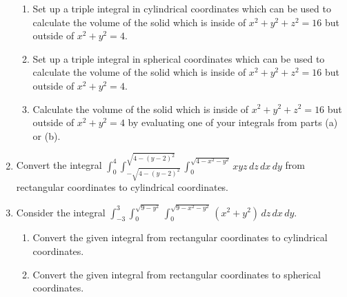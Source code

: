 \documentclass[12pt]{article}
\newif\ifans
\begin{document}
\begin{enumerate}
\begin{enumerate}

\item Set up a triple integral in cylindrical coordinates which can be used to calculate the volume of the solid which is inside of $x^2+y^2+z^2=16$ but outside of $x^2+y^2=4$.

\ifans{\fbox{$V=\int_0^{2\pi} \int_2^4 \int_{-\sqrt{16-r^2}}^{\sqrt{16-r^2}} r \,dz\,dr\,d\theta$}} \fi

\item Set up a triple integral in spherical coordinates which can be used to calculate the volume of the solid which is inside of $x^2+y^2+z^2=16$ but outside of $x^2+y^2=4$.

\ifans{\fbox{$V=\int_0^{2\pi} \int_{\pi/6}^{5\pi/6} \int_{2\csc{\phi}}^4 \rho^2\sin{\phi} \,d\rho\,d\phi\,d\theta$}} \fi

\item Calculate the volume of the solid which is inside of $x^2+y^2+z^2=16$ but outside of $x^2+y^2=4$ by evaluating one of your integrals from parts (a) or (b).

\ifans{\fbox{$32\pi\sqrt{3}$}} \fi

\end{enumerate}

\item Convert the integral $\int_0^4 \int_{-\sqrt{4-(y-2)^2}}^{\sqrt{4-(y-2)^2}} \int_0^{\sqrt{4-x^2-y^2}} xyz \,dz\,dx\,dy$ from rectangular coordinates to cylindrical coordinates.

\ifans{\fbox{$\int_0^\pi \int_0^{4\sin{\theta}} \int_0^{\sqrt{4-r^2}} r^3z\cos{\theta}\sin{\theta} \,dz\,dr\,d\theta$}} \fi

\item Consider the integral $\int_{-3}^3 \int_0^{\sqrt{9-y^2}} \int_0^{\sqrt{9-x^2-y^2}} (x^2+y^2) \,dz\,dx\,dy$.

\begin{enumerate}

\item Convert the given integral from rectangular coordinates to cylindrical coordinates.

\ifans{\fbox{$\int_{-\pi/2}^{\pi/2} \int_0^3 \int_0^{\sqrt{9-r^2}} r^3 \,dz\,dr\,d\theta$; Detailed Solution: \textcolor{blue}{\href{http://www.math.drexel.edu/classes/Calculus/resources/Math200HW/Solutions/20_200_Triple_Integrals_11.pdf}{Here}}}} \fi

\item Convert the given integral from rectangular coordinates to spherical coordinates.

\ifans{\fbox{$\int_0^{\pi/2} \int_{-\pi/2}^{\pi/2} \int_0^3 \rho^4\sin^3{\phi}\,d\rho\,d\theta\,d\phi$; Detailed Solution: \textcolor{blue}{\href{http://www.math.drexel.edu/classes/Calculus/resources/Math200HW/Solutions/20_200_Triple_Integrals_11.pdf}{Here}}}} \fi

\end{enumerate}

\end{enumerate}
\end{document}
